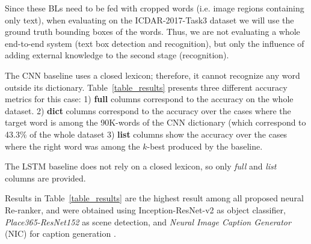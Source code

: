 \documentclass[phd,tocprelim]{cornell}
\begin{document}
Since these BLs need to be fed with cropped words (i.e. image regions containing only text), when evaluating on the ICDAR-2017-Task3 dataset we will use the ground truth bounding boxes of the words. Thus, we are not evaluating a whole end-to-end system (text box detection and recognition), but only the influence of adding external knowledge to the second stage (recognition).

The CNN baseline uses a closed lexicon; therefore, it cannot recognize any word outside its dictionary.  Table~\ref{table_results} presents three different accuracy metrics for this case: 1) \textbf{full} columns correspond to the accuracy on the whole dataset. 2) \textbf{dict} columns correspond to the accuracy over the cases where the target word is among the 90K-words of the CNN dictionary (which correspond to 43.3\% of the whole dataset 3) \textbf{list} columns show the accuracy over the cases where the right word was among the $k$-best produced by the baseline. 


The LSTM baseline does not rely on a closed lexicon, so only \textit{full} and \textit{list} columns are provided.

Results in Table~\ref{table_results} are the highest result among all proposed neural Re-ranker, and were obtained using Inception-ResNet-v2 \cite{szegedy2017inception} as object classifier, \textit{Place365-ResNet152} \cite{zhou2017places} as scene detection, and \textit{Neural Image Caption Generator} (NIC) for caption generation \cite{vinyals2015show}.





    
\end{document}
